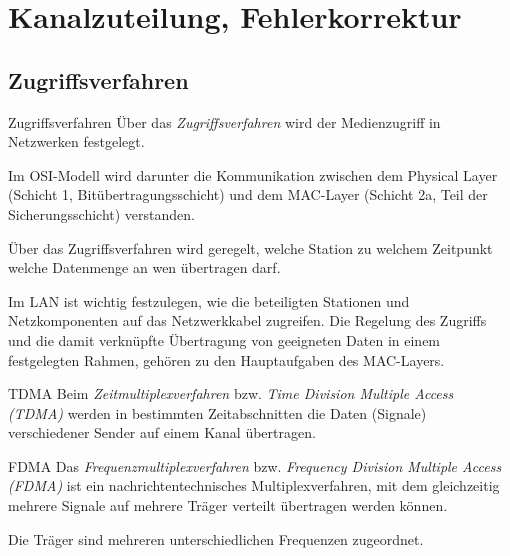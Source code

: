 \section{Kanalzuteilung, Fehlerkorrektur}

\subsection{Zugriffsverfahren}

\begin{defi}{Zugriffsverfahren}
    Über das \emph{Zugriffsverfahren} wird der Medienzugriff in Netzwerken festgelegt.

    Im OSI-Modell wird darunter die Kommunikation zwischen dem Physical Layer (Schicht 1, Bitübertragungsschicht) und dem MAC-Layer (Schicht 2a, Teil der Sicherungsschicht) verstanden.

    Über das Zugriffsverfahren wird geregelt, welche Station zu welchem Zeitpunkt welche Datenmenge an wen übertragen darf.

    Im LAN ist wichtig festzulegen, wie die beteiligten Stationen und Netzkomponenten auf das Netzwerkkabel zugreifen.
    Die Regelung des Zugriffs und die damit verknüpfte Übertragung von geeigneten Daten in einem festgelegten Rahmen, gehören zu den Hauptaufgaben des MAC-Layers.
\end{defi}

\begin{defi}{TDMA}
    Beim \emph{Zeitmultiplexverfahren} bzw. \emph{Time Division Multiple Access (TDMA)} werden in bestimmten Zeitabschnitten  die Daten (Signale) verschiedener Sender auf einem Kanal übertragen.
\end{defi}

\begin{defi}{FDMA}
    Das \emph{Frequenzmultiplexverfahren} bzw. \emph{Frequency Division Multiple Access (FDMA)}  ist ein nachrichtentechnisches Multiplexverfahren, mit dem gleichzeitig mehrere Signale auf mehrere Träger verteilt übertragen werden können.

    Die Träger sind mehreren unterschiedlichen Frequenzen zugeordnet.
\end{defi}

